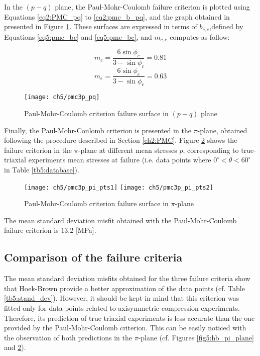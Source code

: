 In the $(p-q)$ plane, the Paul-Mohr-Coulomb failure criterion is plotted using Equations \ref{eq2:PMC_pq} to \ref{eq2:pmc_b_pq}, and the graph obtained in presented in Figure \ref{fig5:pmc_pq}. These surfaces are expressed in terms of $b_{c,e}$,defined by Equations \ref{eq5:pmc_bc} and \ref{eq5:pmc_be}, and $m_{c,e}$ computes as follow: 

\begin{equation}\label{eq5:pmc_mc}
    m_c=\frac{6 \sin \phi_{c}}{3-\sin \phi_{c}} = 0.81
\end{equation}
\begin{equation}\label{eq5:pmc_me}
    m_e=\frac{6 \sin \phi_{e}}{3-\sin \phi_{e}} = 0.63
\end{equation}

\begin{figure}[p]
    \centering
    \texttt{[image: ch5/pmc3p\_pq]}
    \caption{Paul-Mohr-Coulomb criterion failure surface in $(p-q)$ plane}
    \label{fig5:pmc_pq}
\end{figure} 

Finally, the Paul-Mohr-Coulomb criterion is presented in the $\pi$-plane, obtained following the procedure described in Section \ref{ch2:PMC}. Figure \ref{fig5:pmc_pi_plane} shows the failure criterion in the $\pi$-plane at different mean stresses $p$, corresponding to true-triaxial experiments mean stresses at failure (i.e. data points where $0^\circ < \theta < 60^\circ$ in Table \ref{tb5:database}).

\begin{figure}[tb]
    \centering
    \texttt{[image: ch5/pmc3p\_pi\_pts1]}
    \texttt{[image: ch5/pmc3p\_pi\_pts2]}
    \caption{Paul-Mohr-Coulomb criterion failure surface in  $\pi$-plane}
    \label{fig5:pmc_pi_plane}
\end{figure} 

The mean standard deviation misfit obtained with the Paul-Mohr-Coulomb failure criterion is $13.2$ [\si{\mega\pascal}]. 

\subsection{Comparison of the failure criteria}

The mean standard deviation misfits obtained for the three failure criteria show that Hoek-Brown provide a better approximation of the data points (cf. Table \ref{tb5:stand_dev}). However, it should be kept in mind that this criterion was fitted only for data points related to axisymmetric compression experiments. Therefore, its prediction of true triaxial experiments is less accurate than the one provided by the Paul-Mohr-Coulomb criterion. This can be easily noticed with the observation of both predictions in the $\pi$-plane (cf. Figures \ref{fig5:hb_pi_plane} and \ref{fig5:pmc_pi_plane}). 

